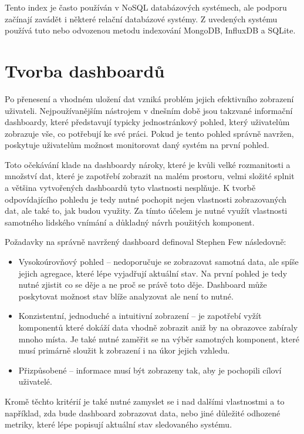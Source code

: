 Tento index je často používán v NoSQL databázových systémech, ale podporu začínají zavádět i některé relační databázové systémy. Z uvedených systému používá tuto nebo odvozenou metodu indexování MongoDB, InfluxDB a SQLite.

\chapter{Tvorba dashboardů}
\label{chapter_dashboard}
Po přenesení a vhodném uložení dat vzniká problém jejich efektivního zobrazení uživateli. Nejpoužívanějším nástrojem v dnešním době jsou takzvané informační dashboardy, které představují typicky jednostránkový pohled, který uživatelům zobrazuje vše, co potřebují ke své práci. Pokud je tento pohled správně navržen, poskytuje uživatelům možnost monitorovat daný systém na první pohled. 

Toto očekávání klade na dashboardy nároky, které je kvůli velké rozmanitosti a množství dat, které je zapotřebí zobrazit na malém prostoru, velmi složité splnit a většina vytvořených dashboardů tyto vlastnosti nesplňuje. K tvorbě odpovídajícího pohledu je tedy nutné pochopit nejen vlastnosti zobrazovaných dat, ale také to, jak budou využity. Za tímto účelem je nutné využít vlastnosti samotného lidského vnímání a důkladný návrh použitých komponent.

Požadavky na správně navržený dashboard definoval Stephen Few \cite{few2004dashboard} následovně:
\begin{itemize}
\item Vysokoúrovňový pohled -- nedoporučuje se zobrazovat samotná data, ale spíše jejich agregace, které lépe vyjadřují aktuální stav. Na první pohled je tedy nutné zjistit co se děje a ne proč se právě toto děje. Dashboard může poskytovat možnost stav blíže analyzovat ale není to nutné.
\item Konzistentní, jednoduché a intuitivní zobrazení -- je zapotřebí vyžít komponentů které dokáží data vhodně zobrazit aniž by na obrazovce zabíraly mnoho místa. Je také nutné zaměřit se na výběr samotných komponent, které musí primárně sloužit k zobrazení i na úkor jejich vzhledu.
\item Přizpůsobené -- informace musí být zobrazeny tak, aby je pochopili cíloví uživatelé.
\end{itemize}
Kromě těchto kritérií je také nutné zamyslet se i nad dalšími vlastnostmi a to například, zda bude dashboard zobrazovat data, nebo jiné důležité odhozené metriky, které lépe popisují aktuální stav sledovaného systému.


